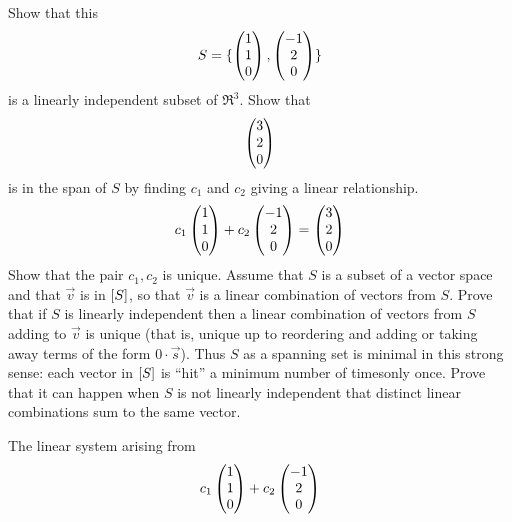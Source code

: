 \begin{exercises}
\begin{exparts}
      \partsitem Show that this 
        \begin{equation*}
          S=\mbox{$\{\begin{pmatrix} 1 \\ 1 \\ 0 \end{pmatrix},\begin{pmatrix} -1 \\ 2 \\ 0 \end{pmatrix}\}$}
        \end{equation*}
        is a linearly independent subset of \( \Re^3 \).
      \partsitem Show that
        \begin{equation*}
          \begin{pmatrix} 3 \\ 2 \\ 0 \end{pmatrix}
        \end{equation*}
        is in the span of $S$ by finding \( c_1 \) and \( c_2 \) 
        giving a linear relationship.
        \begin{equation*}
          c_1\begin{pmatrix} 1 \\ 1 \\ 0 \end{pmatrix}
          +c_2\begin{pmatrix} -1 \\ 2 \\ 0 \end{pmatrix}
          =\begin{pmatrix} 3 \\ 2 \\ 0 \end{pmatrix}
        \end{equation*}
        Show that the pair \( c_1,c_2 \) is unique.
      \partsitem Assume that \( S \) is a subset of a vector space and that
        \( \vec{v} \) is in \( \relax [S\relax ] \), so that \( \vec{v} \) is a
        linear combination of vectors from \( S \).
        Prove that if \( S \) is linearly independent then a linear combination
        of vectors from \( S \) adding to \( \vec{v} \)
        is unique (that is, unique up to reordering
        and adding or taking away terms of the form \( 0\cdot\vec{s} \)).
        Thus \( S \) as a spanning set is minimal in this strong sense:
        each vector in \( \relax [S\relax ] \) is ``hit'' a minimum number of
        times\Dash only once.
      \partsitem
        Prove that it can happen when \( S \) is not linearly 
        independent that distinct linear combinations sum to the same vector.
    \end{exparts}
    \begin{answer}
      \begin{exparts}
        \partsitem The linear system arising from
          \begin{equation*}
            c_1\colvec{1 \\ 1 \\ 0}
            +c_2\colvec{-1 \\ 2 \\ 0}

\end{equation*}
\end{exparts}
\end{answer}
\end{exercises}
